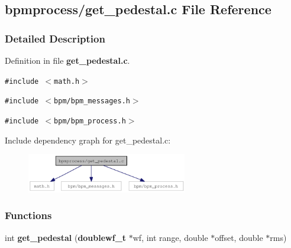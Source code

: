 \subsection{bpmprocess/get\_\-pedestal.c File Reference}
\label{get__pedestal_8c}


\subsubsection{Detailed Description}


Definition in file {\bf get\_\-pedestal.c}.

{\tt \#include $<$math.h$>$}\par
{\tt \#include $<$bpm/bpm\_\-messages.h$>$}\par
{\tt \#include $<$bpm/bpm\_\-process.h$>$}\par


Include dependency graph for get\_\-pedestal.c:\nopagebreak
\begin{figure}[H]
\begin{center}
\leavevmode
\includegraphics[width=198pt]{get__pedestal_8c__incl}
\end{center}
\end{figure}
\subsubsection*{Functions}
\begin{CompactItemize}
\item 
int {\bf get\_\-pedestal} ({\bf doublewf\_\-t} $\ast$wf, int range, double $\ast$offset, double $\ast$rms)
\end{CompactItemize}
